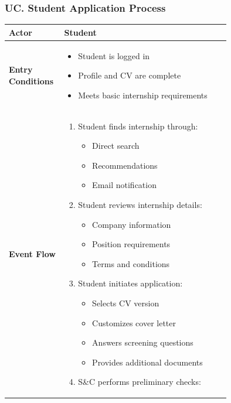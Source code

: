 \subsubsection*{UC\cuc . Student Application Process}
\begin{center}
    \begin{longtable}{|l|p{0.75\linewidth}|}
        \hline
        \textbf{Actor}            & Student \\
        \hline
        \textbf{Entry Conditions} & 
        \begin{itemize}
            \item Student is logged in
            \item Profile and CV are complete
            \item Meets basic internship requirements
        \end{itemize} \\
        \hline
        \textbf{Event Flow}       & 
        \begin{enumerate}
            \item Student finds internship through:
            \begin{itemize}
                \item Direct search
                \item Recommendations
                \item Email notification
            \end{itemize}
            \item Student reviews internship details:
            \begin{itemize}
                \item Company information
                \item Position requirements
                \item Terms and conditions
            \end{itemize}
            \item Student initiates application:
            \begin{itemize}
                \item Selects CV version
                \item Customizes cover letter
                \item Answers screening questions
                \item Provides additional documents
            \end{itemize}
            \item S\&C performs preliminary checks:

\end{enumerate}
\end{longtable}
\end{center}
